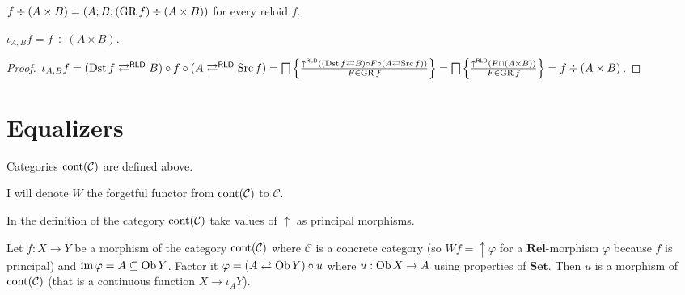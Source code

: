 \begin{defn}
  $f \div (A \times B) = (A ; B ; (\operatorname{GR} f) \div (A \times B))$ for every
  reloid $f$.
\end{defn}

\begin{prop}
  $\iota_{A, B} f = f \div (A \times B)$.
\end{prop}

\begin{proof}
  $\iota_{A, B} f = (\operatorname{Dst} f \rightleftarrows^{\mathsf{RLD}} B)
\circ f \circ (A \rightleftarrows^{\mathsf{RLD}} \operatorname{Src} f) =
\bigsqcap \left\{ \frac{ \uparrow^{\mathsf{RLD}} ((\operatorname{Dst} f
\rightleftarrows B) \circ F \circ (A \rightleftarrows \operatorname{Src} f))
}{ F \in \operatorname{GR} f }\right\} = \bigsqcap \left\{ \frac{
\uparrow^{\mathsf{RLD}} (F \cap (A \times B))}{F \in \operatorname{GR} f }\right\} = f \div (A \times B)$.

\end{proof}

\section{Equalizers}

Categories $\operatorname{cont} (\mathcal{C})$ are defined above.

I will denote $W$ the forgetful functor from $\operatorname{cont}
(\mathcal{C})$ to $\mathcal{C}$.

In the definition of the category $\operatorname{cont} (\mathcal{C})$ take
values of $\uparrow$ as principal morphisms. 

\begin{lem}
  Let $f : X \rightarrow Y$ be a morphism of the category
  $\operatorname{cont} (\mathcal{C})$ where $\mathcal{C}$ is a concrete
  category (so $W f = \uparrow \varphi$ for a $\mathbf{Rel}$-morphism
  $\varphi$ because $f$ is principal) and $\operatorname{im} \varphi = A \subseteq
  \operatorname{Ob} Y$. Factor it $\varphi = (A \rightleftarrows \operatorname{Ob} Y) \circ u$
  where $u : \operatorname{Ob} X \rightarrow A$ using properties of
  $\mathbf{Set}$. Then $u$ is a morphism of $\operatorname{cont}
  (\mathcal{C})$ (that is a continuous function $X \rightarrow \iota_A Y$).
\end{lem}


